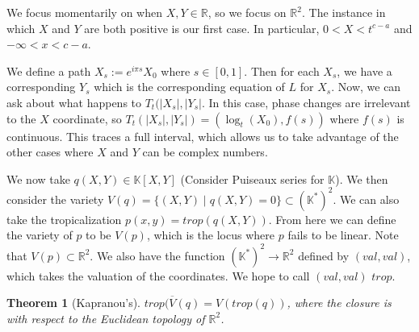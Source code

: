 \documentclass[12pt]{memoir}
\newtheorem{prototheorem}{Theorem}[section]
\newenvironment{theorem}
   {\begin{prototheorem}}
   {\end{prototheorem}}
\theoremstyle{definition}
\def\RR{{\mathbb R}}
\def\KK{{\mathbb K}}
\begin{document}
We focus momentarily on when $X,Y \in \RR$, so we focus on $\RR^2$. The instance in which $X$ and $Y$ are both positive is our first case. In particular, $0<X<t^{c-a}$ and $-\infty<x<c-a$.


We define a path $X_s :=e^{i\pi s}X_0$ where $s \in [0,1]$. Then for each $X_s$, we have a corresponding $Y_s$ which is the corresponding equation of $L$ for $X_s$. Now, we can ask about what happens to $T_t(|X_s|, |Y_s|$. In this case, phase changes are irrelevant to the $X$ coordinate, so $T_t(|X_s|,|Y_s|)= (\log_t(X_0), f(s))$ where $f(s)$ is continuous. This traces a full interval, which allows us to take advantage of the other cases where $X$ and $Y$ can be complex numbers.





We now take $q(X,Y)\in \KK[X,Y]$ (Consider Puiseaux series for $\KK$). We then consider the variety $V(q) = \{(X,Y) \; |\; q(X,Y) = 0 \} \subset (\KK^*)^2$. We can also take the tropicalization $p(x,y) = trop(q(X,Y))$. From here we can define the variety of $p$ to be $V(p)$, which is the locus where $p$ fails to be linear. Note that $V(p) \subset \RR^2$. We also have the function $(\KK^*)^2 \rightarrow \RR^2$ defined by $(val, val)$, which takes the valuation of the coordinates. We hope to call $(val, val)$ $trop$. 

\begin{theorem}[Kapranou's]
$\overline{trop(V(q)} = V(trop(q))$, where the closure is with respect to the Euclidean topology of $\RR^2$.
\end{theorem}
\end{document}
